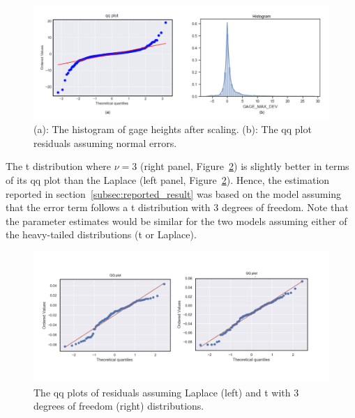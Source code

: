 \documentclass{svjour3}
\begin{document}
\begin{figure}[htbp]
 \begin{center}
     \includegraphics[width=\textwidth]{../images/qq_and_hist_gage_height_after_scaling.png}
\caption{(a): The histogram of gage heights after scaling. (b): The qq plot residuals assuming normal errors.}
\label{fig:hist_original}
 \end{center}
\end{figure}

The t distribution where $ \nu =3 $ (right panel, Figure~\ref{fig:qq_comp}) is slightly better in terms of its qq plot than the Laplace (left panel, Figure~\ref{fig:qq_comp}).
Hence, the estimation reported in section~\ref{subsec:reported_result} was based on the model assuming that the error term follows a t distribution with 3 degrees of freedom.
Note that the parameter estimates would be similar for the two models assuming either of the heavy-tailed distributions (t or Laplace).

\begin{figure}[htbp]
 \begin{center}
\includegraphics[width=1\textwidth]{../images/qq_plot_for_residuals.png}
\caption{The qq plots of residuals assuming Laplace (left) and t with 3 degrees of freedom (right) distributions.}
\label{fig:qq_comp}
 \end{center}
\end{figure}
\end{document}
